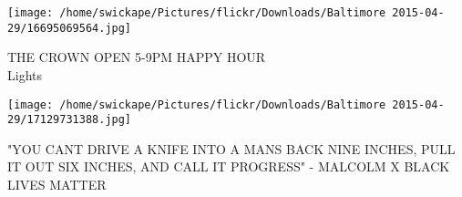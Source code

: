 \documentclass[10pt,letterpaper]{article}
\begin{document}
\vspace{0.25in}
\texttt{[image: /home/swickape/Pictures/flickr/Downloads/Baltimore 2015-04-29/16695069564.jpg]}

THE CROWN OPEN 5{-}9PM HAPPY HOUR\\
Lights\\
\pagebreak

\texttt{[image: /home/swickape/Pictures/flickr/Downloads/Baltimore 2015-04-29/17129731388.jpg]}

"YOU CANT DRIVE A KNIFE INTO A MANS BACK NINE INCHES, PULL IT OUT SIX INCHES, AND CALL IT PROGRESS" {-} MALCOLM X BLACK LIVES MATTER\\
\pagebreak
\end{document}
